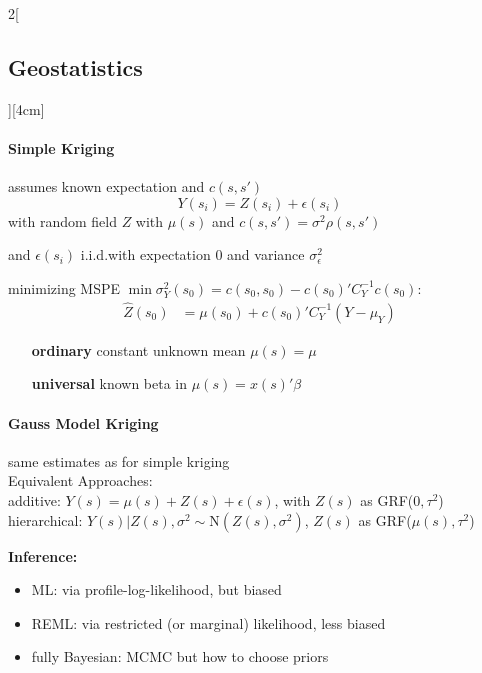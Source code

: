 \documentclass[8pt]{extarticle}
\begin{document}
\begin{multicols}{2}[\subsection{Geostatistics}][4cm]
\paragraph{Simple Kriging} assumes known expectation and $c(s,s')$
$$Y(s_i) = Z(s_i) + \epsilon(s_i)$$
with random field $Z$ with $\mu(s)$ and $c(s,s')=\sigma^2 \rho(s,s')$ 

\noindent and $\epsilon(s_i)$ i.i.d.\@ with expectation $0$ and variance $\sigma_\epsilon^2$

minimizing MSPE $\min \sigma_Y^2(s_0) = c(s_0,s_0)-c(s_0)'C_Y^{-1}c(s_0)$:
\begin{align*}
\hat{Z} (s_0) &=\mu(s_0)+c(s_0)'C_Y^{-1}(Y-\mu_Y)
\end{align*}
\begin{itemize}[leftmargin=6.1em,itemsep=-0.5em]
\item[\textbf{ordinary}] constant unknown mean $\mu(s)=\mu$
\item[\textbf{universal}] known beta in $\mu(s)=x(s)'\beta$
\end{itemize}

\paragraph{Gauss Model Kriging} same estimates as for simple kriging \\

\noindent Equivalent Approaches:\\
\noindent additive: $Y(s)=\mu(s)+Z(s)+\epsilon(s)$, with $Z(s)$ as GRF($0,\tau^2$)
hierarchical: $Y(s)|Z(s),\sigma^2 \sim \mathrm{N}(Z(s), \sigma^2)$, $Z(s)$ as GRF($\mu(s),\tau^2$)

\vspace{0.5em}
\textbf{Inference:}
\vspace{-0.7em}
\begin{itemize}[itemsep=-0.3em]
\item ML: via profile-log-likelihood, but biased
\item REML: via restricted (or marginal) likelihood, less biased
\item fully Bayesian: MCMC but how to choose priors
\end{itemize}



\end{multicols}
\end{document}
